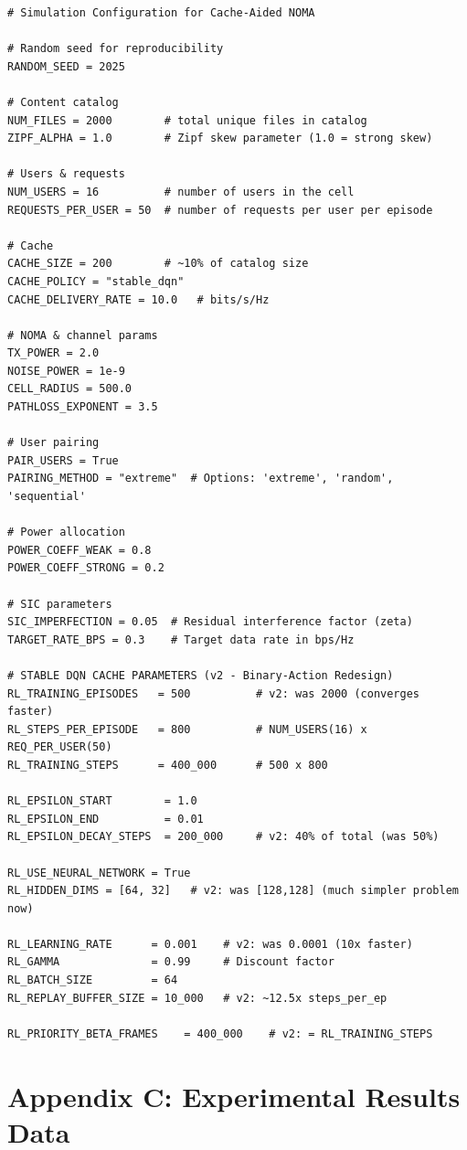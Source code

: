 \documentclass[12pt,a4paper]{article}
\begin{document}
\begin{verbatim}
# Simulation Configuration for Cache-Aided NOMA

# Random seed for reproducibility
RANDOM_SEED = 2025

# Content catalog
NUM_FILES = 2000        # total unique files in catalog
ZIPF_ALPHA = 1.0        # Zipf skew parameter (1.0 = strong skew)

# Users & requests
NUM_USERS = 16          # number of users in the cell
REQUESTS_PER_USER = 50  # number of requests per user per episode

# Cache
CACHE_SIZE = 200        # ~10% of catalog size
CACHE_POLICY = "stable_dqn"
CACHE_DELIVERY_RATE = 10.0   # bits/s/Hz

# NOMA & channel params
TX_POWER = 2.0
NOISE_POWER = 1e-9
CELL_RADIUS = 500.0
PATHLOSS_EXPONENT = 3.5

# User pairing
PAIR_USERS = True
PAIRING_METHOD = "extreme"  # Options: 'extreme', 'random', 'sequential'

# Power allocation
POWER_COEFF_WEAK = 0.8
POWER_COEFF_STRONG = 0.2

# SIC parameters
SIC_IMPERFECTION = 0.05  # Residual interference factor (zeta)
TARGET_RATE_BPS = 0.3    # Target data rate in bps/Hz

# STABLE DQN CACHE PARAMETERS (v2 - Binary-Action Redesign)
RL_TRAINING_EPISODES   = 500          # v2: was 2000 (converges faster)
RL_STEPS_PER_EPISODE   = 800          # NUM_USERS(16) x REQ_PER_USER(50)
RL_TRAINING_STEPS      = 400_000      # 500 x 800

RL_EPSILON_START        = 1.0
RL_EPSILON_END          = 0.01
RL_EPSILON_DECAY_STEPS  = 200_000     # v2: 40% of total (was 50%)

RL_USE_NEURAL_NETWORK = True
RL_HIDDEN_DIMS = [64, 32]   # v2: was [128,128] (much simpler problem now)

RL_LEARNING_RATE      = 0.001    # v2: was 0.0001 (10x faster)
RL_GAMMA              = 0.99     # Discount factor
RL_BATCH_SIZE         = 64
RL_REPLAY_BUFFER_SIZE = 10_000   # v2: ~12.5x steps_per_ep

RL_PRIORITY_BETA_FRAMES    = 400_000    # v2: = RL_TRAINING_STEPS
\end{verbatim}

\clearpage

\section*{Appendix C: Experimental Results Data}
\end{document}
